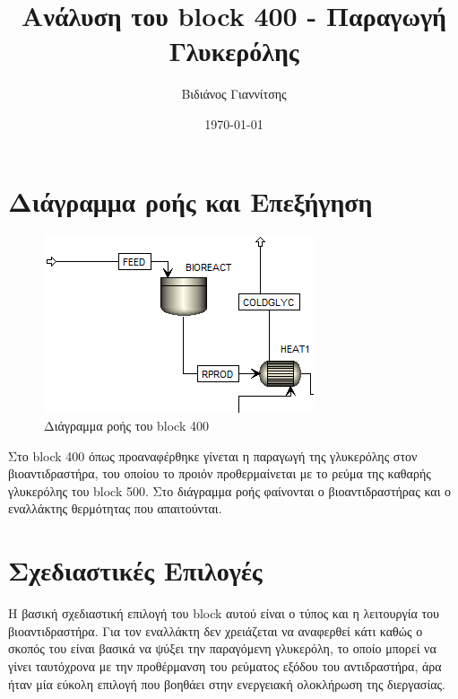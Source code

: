 \documentclass[11pt]{article}
\author{Βιδιάνος Γιαννίτσης}
\date{\today}
\title{Ανάλυση του block 400 - Παραγωγή Γλυκερόλης}
\begin{document}
\maketitle
\tableofcontents

\renewcommand{\abstractname}{Περίληψη}
\renewcommand{\tablename}{Πίνακας}
\renewcommand{\figurename}{Σχήμα}
\renewcommand\listingscaption{Κώδικας}

\section{Διάγραμμα ροής και Επεξήγηση}
\label{sec:orgc362d2b}
\begin{figure}[htbp]
\centering
\includegraphics[width=.9\linewidth]{Διάγραμμα_ροής_και_Επεξήγηση/2023-01-12_16-53-41_screenshot.png}
\caption{Διάγραμμα ροής του block 400}
\end{figure}


Στο block 400 όπως προαναφέρθηκε γίνεται η παραγωγή της γλυκερόλης στον βιοαντιδραστήρα, του οποίου το προιόν προθερμαίνεται με το ρεύμα της καθαρής γλυκερόλης του block 500. Στο διάγραμμα ροής φαίνονται ο βιοαντιδραστήρας και ο εναλλάκτης θερμότητας που απαιτούνται.

\section{Σχεδιαστικές Επιλογές}
\label{sec:orgb921809}
Η βασική σχεδιαστική επιλογή του block αυτού είναι ο τύπος και η λειτουργία του βιοαντιδραστήρα. Για τον εναλλάκτη δεν χρειάζεται να αναφερθεί κάτι καθώς ο σκοπός του είναι βασικά να ψύξει την παραγόμενη γλυκερόλη, το οποίο μπορεί να γίνει ταυτόχρονα με την προθέρμανση του ρεύματος εξόδου του αντιδραστήρα, άρα ήταν μία εύκολη επιλογή που βοηθάει στην ενεργειακή ολοκλήρωση της διεργασίας.
\end{document}
